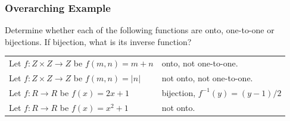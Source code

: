 \documentclass[12pt, letterpaper]{article}
\begin{document}
\pagebreak

\subsubsection*{Overarching Example}
Determine whether each of the following functions are onto, one-to-one or bijections. If bijection, what is its inverse function? \smallbreak
\begin{tabular}{l l}
	Let $f: Z \times Z \rightarrow Z$ be $f(m,n) = m + n$ \quad \quad & onto, not one-to-one. \\
	Let  $f: Z \times Z \rightarrow Z$ be $f(m,n) = |n|$ & not onto, not one-to-one. \\ 
	Let $f: R \rightarrow R$ be $f(x) = 2x+1$ & bijection, $f^{-1} (y) = (y-1)/2$ \\ 
	Let $f: R \rightarrow R$ be $f(x) = x^2 +1$ & not onto.
\end{tabular}

\pagebreak
\end{document}
